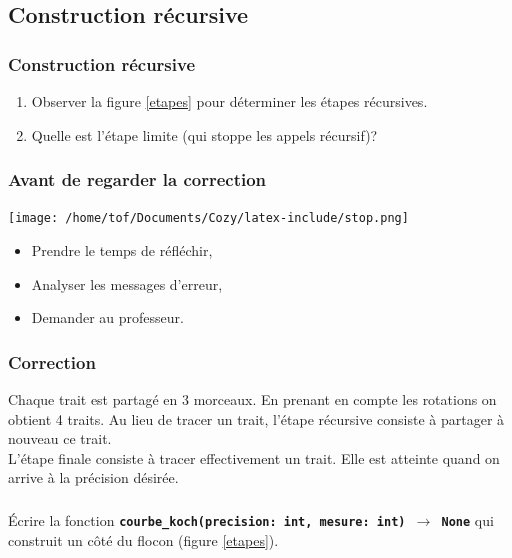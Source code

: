\documentclass[svgnames,11pt]{beamer}
\begin{document}
\subsection{Construction récursive}
\begin{frame}
    \frametitle{Construction récursive}
\begin{activite}
\begin{enumerate}
    \item Observer la figure \ref{etapes} pour déterminer les étapes récursives.
    \item Quelle est l'étape limite (qui stoppe les appels récursif)?
\end{enumerate}
\end{activite}
    

\end{frame}
\begin{frame}
    \frametitle{Avant de regarder la correction}
\begin{center}
    \centering
    \texttt{[image: /home/tof/Documents/Cozy/latex-include/stop.png]}
    \end{center}
{\Large
    \begin{itemize}
        \item Prendre le temps de réfléchir,
        \item Analyser les messages d'erreur,
        \item Demander au professeur.
    \end{itemize}
}
\end{frame}
\begin{frame}
    \frametitle{Correction}

Chaque trait est partagé en 3 morceaux. En prenant en compte les rotations on obtient 4 traits. Au lieu de tracer un trait, l'étape récursive consiste à partager à nouveau ce trait.\\L'étape finale consiste à tracer effectivement un trait. Elle est atteinte quand on arrive à la précision désirée.

\end{frame}
\begin{frame}
    \frametitle{}

    \begin{activite}
    Écrire la fonction \textbf{\texttt{courbe\_koch(precision: int, mesure: int) $\rightarrow$ None}}
    qui construit un côté du flocon (figure \ref{etapes}).
\end{activite} 

\end{frame}
\end{document}
